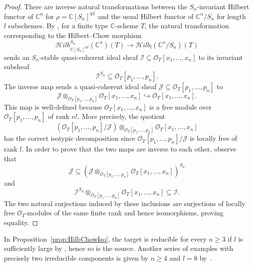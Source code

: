 \documentclass[11pt]{amsart}
\theoremstyle{definition}
\newcommand{\CC}{\mathbb{C}}
\begin{document}
\begin{proof}
    There are inverse natural transformations between the $S_n$-invariant Hilbert functor of $\CC^n$ for $\rho = \CC[S_n]^{\oplus l}$ and the usual Hilbert functor of $\CC^n/S_n$ for length~$l$ subschemes. By \cite[Section~3.4]{BrionInvariantHilb}, for a finite type $\CC$-scheme $T$, the natural transformation corresponding to the Hilbert--Chow morphism
    \begin{equation*}
        \mathcal{H}ilb^{S_n}_{\CC[S_n]^{\oplus l}}(\CC^n)(T) \rightarrow \mathcal{H}ilb_l(\CC^n/S_n)(T)
    \end{equation*}
    sends an $S_n$-stable quasi-coherent ideal sheaf $\mathcal{I} \subseteq \mathcal{O}_T[x_1,\ldots,x_n]$ to its invariant subsheaf
    $$\mathcal{I}^{S_n} \subseteq \mathcal{O}_T[p_1,\ldots,p_n].$$
    The inverse map sends a quasi-coherent ideal sheaf $\mathcal{J} \subseteq \mathcal{O}_T[p_1,\ldots,p_n]$ to
    $$\mathcal{J} \otimes_{\mathcal{O}_T[p_1,\ldots,p_n]} \mathcal{O}_T[x_1,\ldots,x_n] \hookrightarrow \mathcal{O}_T[x_1,\ldots,x_n].$$
    This map is well-defined because $\mathcal{O}_T[x_1,\ldots,x_n]$ is a free module over $\mathcal{O}_T[p_1,\ldots,p_n]$ of rank $n!$. More precisely, the quotient
    \begin{equation*}
        \left( \mathcal{O}_T[p_1,\ldots,p_n] / \mathcal{J} \right) \otimes_{\mathcal{O}_T[p_1,\ldots,p_n]} \mathcal{O}_T[x_1,\ldots,x_n]
    \end{equation*}
    has the correct isotypic decomposition since $\mathcal{O}_T[p_1,\ldots,p_n] / \mathcal{J}$ is locally free of rank $l$.
    In order to prove that the two maps are inverse to each other, observe that
    $$\mathcal{J} \subseteq \left(\mathcal{J} \otimes_{\mathcal{O}_T[p_1,\ldots,p_n]} \mathcal{O}_T[x_1,\ldots,x_n]\right)^{S_n}$$
    and
    $$\mathcal{I}^{S_n} \otimes_{\mathcal{O}_T[p_1,\ldots,p_n]} \mathcal{O}_T[x_1,\ldots,x_n] \subseteq \mathcal{I}.$$
    The two natural surjections induced by these inclusions are surjections of locally free $\mathcal{O}_T$-modules of the same finite rank and hence isomorphisms, proving equality.
    \end{proof}

In Proposition~\ref{prop:HilbChowIso}, the target is reducible for every $n \geq 3$ if $l$ is sufficiently large by \cite{Iarrobino1972Reducibility}, hence so is the source. Another series of examples with precisely two irreducible components is given by $n \geq 4$ and $l = 8$ by~\cite{Cartwright2009HilbertSchemeOf8Points}.
\end{document}
